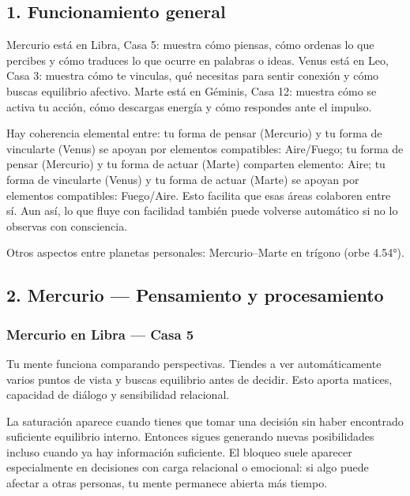 \documentclass[11pt,a4paper]{article}
\begin{document}
\justifying

\vspace{0.8cm}

\subsection{1. Funcionamiento general}

\justifying
Mercurio está en Libra, Casa 5: muestra cómo piensas, cómo ordenas lo que percibes y cómo traduces lo que ocurre en palabras o ideas.
Venus está en Leo, Casa 3: muestra cómo te vinculas, qué necesitas para sentir conexión y cómo buscas equilibrio afectivo.
Marte está en Géminis, Casa 12: muestra cómo se activa tu acción, cómo descargas energía y cómo respondes ante el impulso.

Hay coherencia elemental entre: tu forma de pensar (Mercurio) y tu forma de vincularte (Venus) se apoyan por elementos compatibles: Aire/Fuego; tu forma de pensar (Mercurio) y tu forma de actuar (Marte) comparten elemento: Aire; tu forma de vincularte (Venus) y tu forma de actuar (Marte) se apoyan por elementos compatibles: Fuego/Aire. Esto facilita que esas áreas colaboren entre sí. Aun así, lo que fluye con facilidad también puede volverse automático si no lo observas con consciencia.

Otros aspectos entre planetas personales: Mercurio–Marte en trígono (orbe 4.54°).

\vspace{0.8cm}

\subsection{2. Mercurio — Pensamiento y procesamiento}

\subsubsection*{Mercurio en Libra — Casa 5}

\justifying
Tu mente funciona comparando perspectivas. Tiendes a ver automáticamente varios puntos de vista y buscas equilibrio antes de decidir. Esto aporta matices, capacidad de diálogo y sensibilidad relacional.

La saturación aparece cuando tienes que tomar una decisión sin haber encontrado suficiente equilibrio interno. Entonces sigues generando nuevas posibilidades incluso cuando ya hay información suficiente. El bloqueo suele aparecer especialmente en decisiones con carga relacional o emocional: si algo puede afectar a otras personas, tu mente permanece abierta más tiempo.
\end{document}
